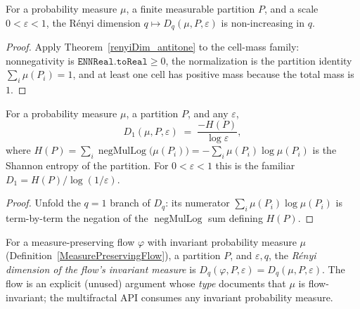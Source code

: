 \begin{theorem}\label{renyiDimMeasure_antitone}
  \leanok
  For a probability measure \(\mu\), a finite measurable partition \(P\), and a scale
  \(0 < \varepsilon < 1\), the R\'enyi dimension \(q \mapsto D_q(\mu, P, \varepsilon)\) is
  non-increasing in \(q\).
\end{theorem}
\begin{proof}\leanok
  Apply Theorem~\ref{renyiDim_antitone} to the cell-mass family: nonnegativity is
  \(\texttt{ENNReal.toReal} \ge 0\), the normalization is the partition identity
  \(\sum_i \mu(P_i) = 1\), and at least one cell has positive mass because the total mass is
  \(1\).
\end{proof}

\begin{theorem}\label{renyiDimMeasure_one_eq}
  \leanok
  For a probability measure \(\mu\), a partition \(P\), and any \(\varepsilon\),
  \[
    D_1(\mu, P, \varepsilon) \;=\; \frac{-H(P)}{\log \varepsilon},
  \]
  where \(H(P) = \sum_i \operatorname{negMulLog}\bigl(\mu(P_i)\bigr)
  = -\sum_i \mu(P_i)\log\mu(P_i)\) is the Shannon entropy of the partition. For
  \(0 < \varepsilon < 1\) this is the familiar \(D_1 = H(P)/\log(1/\varepsilon)\).
\end{theorem}
\begin{proof}\leanok
  Unfold the \(q = 1\) branch of \(D_q\): its numerator \(\sum_i \mu(P_i)\log\mu(P_i)\) is
  term-by-term the negation of the \(\operatorname{negMulLog}\) sum defining \(H(P)\).
\end{proof}

\begin{definition}\label{renyiDimFlow}
  \leanok
  For a measure-preserving flow \(\varphi\) with invariant probability measure \(\mu\)
  (Definition~\ref{MeasurePreservingFlow}), a partition \(P\), and \(\varepsilon, q\), the
  \emph{R\'enyi dimension of the flow's invariant measure} is
  \(D_q(\varphi, P, \varepsilon) = D_q(\mu, P, \varepsilon)\). The flow is an explicit (unused)
  argument whose \emph{type} documents that \(\mu\) is flow-invariant; the multifractal API
  consumes any invariant probability measure.
\end{definition}

